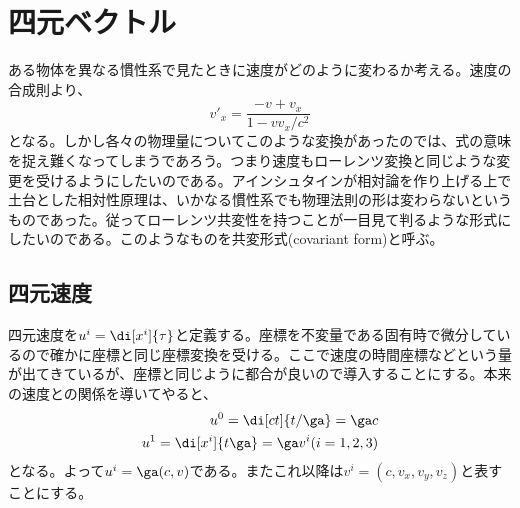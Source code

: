     \section{四元ベクトル}
            ある物体を異なる慣性系で見たときに速度がどのように変わるか考える。速度の合成則より、
                \[v'_x = \frac{-v+v_x}{1-vv_x/c^2}\]
            となる。しかし各々の物理量についてこのような変換があったのでは、式の意味を捉え難くなってしまうであろう。つまり速度もローレンツ変換と同じような変更を受けるようにしたいのである。アインシュタインが相対論を作り上げる上で土台とした相対性原理は、いかなる慣性系でも物理法則の形は変わらないというものであった。従ってローレンツ共変性を持つことが一目見て判るような形式にしたいのである。このようなものを共変形式(covariant form)と呼ぶ。
        \subsection{四元速度}
            四元速度を$u^i=\di[x^i]{\tau}$と定義する。座標を不変量である固有時で微分しているので確かに座標と同じ座標変換を受ける。ここで速度の時間座標などという量が出てきているが、座標と同じように都合が良いので導入することにする。本来の速度との関係を導いてやると、
            \begin{align*}
                u^0 = \di[ct]{t/\ga} = \ga c\\
                u^1 = \di[x^i]{t\ga} = \ga v^i(i=1,2,3)
            \end{align*}
            となる。よって$u^i=\ga(c,v)$である。またこれ以降は$v^i=(c,v_x,v_y,v_z)$と表すことにする。
